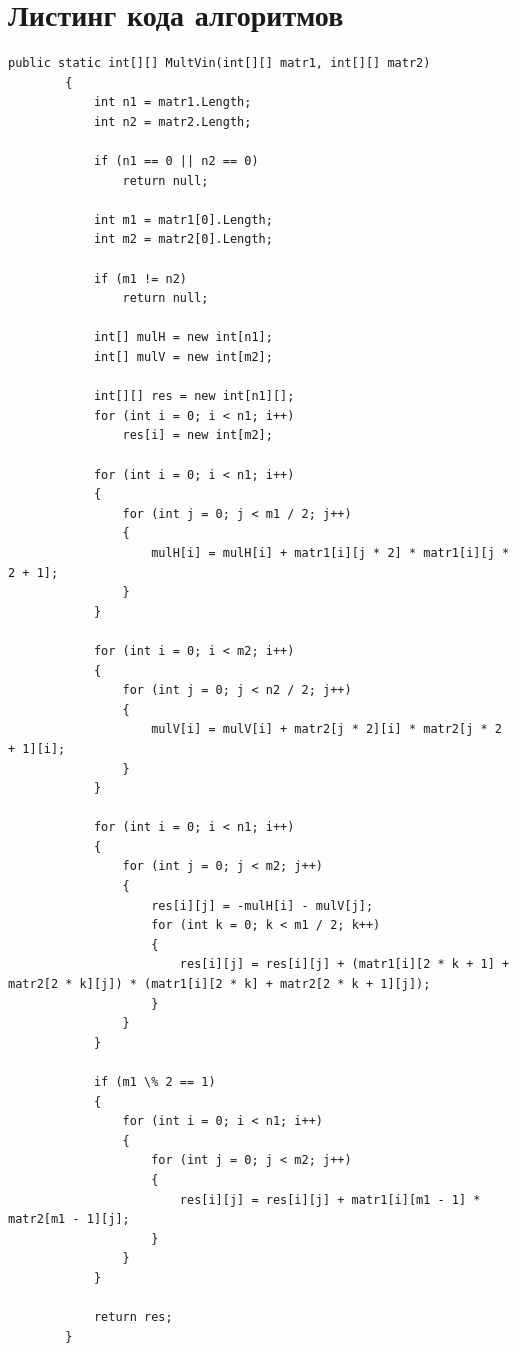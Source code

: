 \documentclass[12pt]{report}
\begin{document}
\section{Листинг кода алгоритмов}


\begin{lstlisting}[label=some-code,caption=Алгоритм Винограда]
public static int[][] MultVin(int[][] matr1, int[][] matr2)
        {
            int n1 = matr1.Length;
            int n2 = matr2.Length;

            if (n1 == 0 || n2 == 0)
                return null;

            int m1 = matr1[0].Length;
            int m2 = matr2[0].Length;

            if (m1 != n2)
                return null;

            int[] mulH = new int[n1];
            int[] mulV = new int[m2];

            int[][] res = new int[n1][];
            for (int i = 0; i < n1; i++)
                res[i] = new int[m2];

            for (int i = 0; i < n1; i++)
            {
                for (int j = 0; j < m1 / 2; j++)
                {
                    mulH[i] = mulH[i] + matr1[i][j * 2] * matr1[i][j * 2 + 1];
                }
            }

            for (int i = 0; i < m2; i++)
            {
                for (int j = 0; j < n2 / 2; j++)
                {
                    mulV[i] = mulV[i] + matr2[j * 2][i] * matr2[j * 2 + 1][i];
                }
            }

            for (int i = 0; i < n1; i++)
            {
                for (int j = 0; j < m2; j++)
                {
                    res[i][j] = -mulH[i] - mulV[j];
                    for (int k = 0; k < m1 / 2; k++)
                    {
                        res[i][j] = res[i][j] + (matr1[i][2 * k + 1] + matr2[2 * k][j]) * (matr1[i][2 * k] + matr2[2 * k + 1][j]);
                    }
                }
            }

            if (m1 \% 2 == 1)
            {
                for (int i = 0; i < n1; i++)
                {
                    for (int j = 0; j < m2; j++)
                    {
                        res[i][j] = res[i][j] + matr1[i][m1 - 1] * matr2[m1 - 1][j];
                    }
                }
            }

            return res;
        }
\end{lstlisting}
\end{document}
